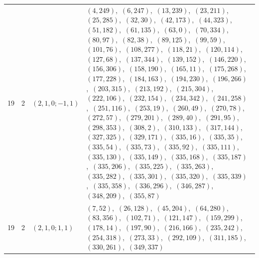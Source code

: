 \documentclass[11pt]{article}
\begin{document}
\begin{longtable}{@{}rrl>{\raggedright\arraybackslash}p{}@{}}
19 & 2 & $(2,1,0;-1,1)$ & $(4,249)$,\allowbreak\ $(6,247)$,\allowbreak\ $(13,239)$,\allowbreak\ $(23,211)$,\allowbreak\ $(25,285)$,\allowbreak\ $(32,30)$,\allowbreak\ $(42,173)$,\allowbreak\ $(44,323)$,\allowbreak\ $(51,182)$,\allowbreak\ $(61,135)$,\allowbreak\ $(63,0)$,\allowbreak\ $(70,334)$,\allowbreak\ $(80,97)$,\allowbreak\ $(82,38)$,\allowbreak\ $(89,125)$,\allowbreak\ $(99,59)$,\allowbreak\ $(101,76)$,\allowbreak\ $(108,277)$,\allowbreak\ $(118,21)$,\allowbreak\ $(120,114)$,\allowbreak\ $(127,68)$,\allowbreak\ $(137,344)$,\allowbreak\ $(139,152)$,\allowbreak\ $(146,220)$,\allowbreak\ $(156,306)$,\allowbreak\ $(158,190)$,\allowbreak\ $(165,11)$,\allowbreak\ $(175,268)$,\allowbreak\ $(177,228)$,\allowbreak\ $(184,163)$,\allowbreak\ $(194,230)$,\allowbreak\ $(196,266)$,\allowbreak\ $(203,315)$,\allowbreak\ $(213,192)$,\allowbreak\ $(215,304)$,\allowbreak\ $(222,106)$,\allowbreak\ $(232,154)$,\allowbreak\ $(234,342)$,\allowbreak\ $(241,258)$,\allowbreak\ $(251,116)$,\allowbreak\ $(253,19)$,\allowbreak\ $(260,49)$,\allowbreak\ $(270,78)$,\allowbreak\ $(272,57)$,\allowbreak\ $(279,201)$,\allowbreak\ $(289,40)$,\allowbreak\ $(291,95)$,\allowbreak\ $(298,353)$,\allowbreak\ $(308,2)$,\allowbreak\ $(310,133)$,\allowbreak\ $(317,144)$,\allowbreak\ $(327,325)$,\allowbreak\ $(329,171)$,\allowbreak\ $(335,16)$,\allowbreak\ $(335,35)$,\allowbreak\ $(335,54)$,\allowbreak\ $(335,73)$,\allowbreak\ $(335,92)$,\allowbreak\ $(335,111)$,\allowbreak\ $(335,130)$,\allowbreak\ $(335,149)$,\allowbreak\ $(335,168)$,\allowbreak\ $(335,187)$,\allowbreak\ $(335,206)$,\allowbreak\ $(335,225)$,\allowbreak\ $(335,263)$,\allowbreak\ $(335,282)$,\allowbreak\ $(335,301)$,\allowbreak\ $(335,320)$,\allowbreak\ $(335,339)$,\allowbreak\ $(335,358)$,\allowbreak\ $(336,296)$,\allowbreak\ $(346,287)$,\allowbreak\ $(348,209)$,\allowbreak\ $(355,87)$\\
19 & 2 & $(2,1,0;1,1)$ & $(7,52)$,\allowbreak\ $(26,128)$,\allowbreak\ $(45,204)$,\allowbreak\ $(64,280)$,\allowbreak\ $(83,356)$,\allowbreak\ $(102,71)$,\allowbreak\ $(121,147)$,\allowbreak\ $(159,299)$,\allowbreak\ $(178,14)$,\allowbreak\ $(197,90)$,\allowbreak\ $(216,166)$,\allowbreak\ $(235,242)$,\allowbreak\ $(254,318)$,\allowbreak\ $(273,33)$,\allowbreak\ $(292,109)$,\allowbreak\ $(311,185)$,\allowbreak\ $(330,261)$,\allowbreak\ $(349,337)$\\

\end{longtable}
\end{document}
